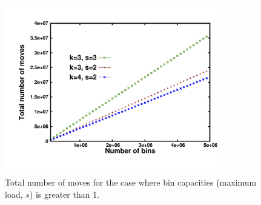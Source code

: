 \begin{figure}[h!]
   \centering  
    \includegraphics[width=0.85\textwidth]{totalGen-3-2.pdf}
    \caption{Total number of moves for the case where bin capacities (maximum load, $s$) is greater than 1.}
    \label{fig:totalGen}
    \end{figure}

